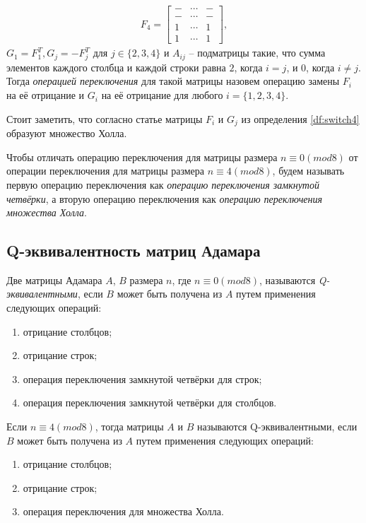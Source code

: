 \documentclass[a4paper, 14pt]{extreport}
\begin{document}
\begin{Df}
\begin{gather*}
        F_4 =
        \begin{bmatrix}
            - & \cdots & - \\
            - & \cdots & - \\
            1 & \cdots & 1 \\
            1 & \cdots & 1
        \end{bmatrix},
    \end{gather*}
    $G_1 = F_1^T, G_j = -F_j^T$ для $j \in \{2, 3, 4\}$ и $A_{ij}$ -- подматрицы такие, что сумма элементов каждого столбца и каждой строки равна $2$, когда $i=j$, и $0$, когда $i \neq j$. Тогда {\it операцией переключения} для такой матрицы назовем операцию замены $F_i$ на её отрицание и $G_i$ на её отрицание для любого $i = \{1, 2, 3, 4\}$.
\end{Df}

Стоит заметить, что согласно статье \cite{kimura:hs} матрицы $F_i$ и $G_j$ из определения \ref{df:switch4} образуют множество Холла.

Чтобы отличать операцию переключения для матрицы размера $n \equiv 0(mod8)$ от операции переключения для матрицы размера $n \equiv 4(mod8)$, будем называть первую операцию переключения как {\it операцию переключения замкнутой четвёрки}, а вторую операцию переключения как {\it операцию переключения множества Холла}.

\subsection{Q-эквивалентность матриц Адамара}

\begin{Df}[Q-эквивалентность]\normalfont\label{df:q_eq_df}
    Две матрицы Адамара $A$, $B$ размера $n$, где $n \equiv 0(mod8)$, называются {\it Q-эквивалентными}, если $B$ может быть получена из $A$ путем применения следующих операций:
    \begin{enumerate}
        \item отрицание столбцов;
        \item отрицание строк;
        \item операция переключения замкнутой четвёрки для строк;
        \item операция переключения замкнутой четвёрки для столбцов.
    \end{enumerate}
    Если $n \equiv 4(mod8)$, тогда матрицы $A$ и $B$ называются Q-эквивалентными, если $B$ может быть получена из $A$ путем применения следующих операций:
    \begin{enumerate}
        \item отрицание столбцов;
        \item отрицание строк;
        \item операция переключения для множества Холла.
    \end{enumerate}
\end{Df}
\end{document}
